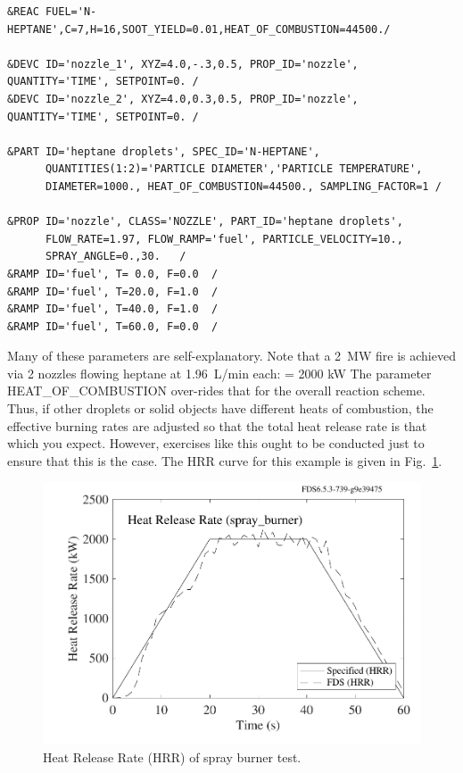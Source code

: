 \documentclass[11pt]{book}
\begin{document}
\begin{lstlisting}
&REAC FUEL='N-HEPTANE',C=7,H=16,SOOT_YIELD=0.01,HEAT_OF_COMBUSTION=44500./

&DEVC ID='nozzle_1', XYZ=4.0,-.3,0.5, PROP_ID='nozzle', QUANTITY='TIME', SETPOINT=0. /
&DEVC ID='nozzle_2', XYZ=4.0,0.3,0.5, PROP_ID='nozzle', QUANTITY='TIME', SETPOINT=0. /

&PART ID='heptane droplets', SPEC_ID='N-HEPTANE',
      QUANTITIES(1:2)='PARTICLE DIAMETER','PARTICLE TEMPERATURE',
      DIAMETER=1000., HEAT_OF_COMBUSTION=44500., SAMPLING_FACTOR=1 /

&PROP ID='nozzle', CLASS='NOZZLE', PART_ID='heptane droplets',
      FLOW_RATE=1.97, FLOW_RAMP='fuel', PARTICLE_VELOCITY=10.,
      SPRAY_ANGLE=0.,30.   /
&RAMP ID='fuel', T= 0.0, F=0.0  /
&RAMP ID='fuel', T=20.0, F=1.0  /
&RAMP ID='fuel', T=40.0, F=1.0  /
&RAMP ID='fuel', T=60.0, F=0.0  /
\end{lstlisting}

\noindent
Many of these parameters are self-explanatory. Note that a 2~MW fire is achieved via 2 nozzles flowing heptane at 1.96~L/min each:
  \;  \times {} \;   \;
 \times {} \;   \;
 = 2000 \; \hbox{kW} \ee
The parameter {\ct HEAT\_OF\_COMBUSTION} over-rides that for the overall
reaction scheme. Thus, if other droplets or solid objects have different
heats of combustion, the effective burning rates are adjusted so that the
total heat release rate is that which you expect. However, exercises
like this ought to be conducted just to ensure that this is the case.
The HRR curve for this example is given in Fig.~\ref{spray_burner}.

\begin{figure}[ht]
\begin{center}
\includegraphics[width=4.5in]{SCRIPT_FIGURES/spray_burner_HRR}
\end{center}
\caption[Results of the {\ct spray\_burner} test case]{Heat Release Rate (HRR) of spray burner test.}
\label{spray_burner}
\end{figure}
\end{document}
